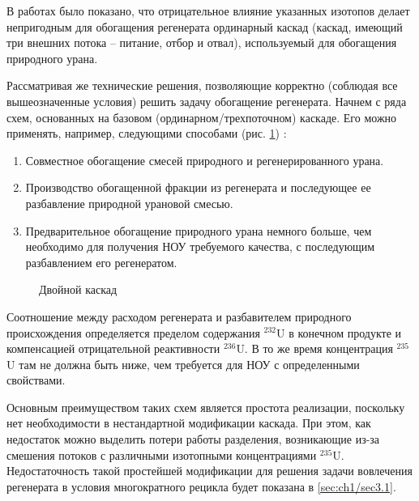 В работах \cite{sulaberidzeNekotoryhRazdelitelnyhProblemah2004,sulaberidzeProblemsRefinementRecycled4, smirnovKaskadnyeShemyZadachah2012} было показано, что отрицательное влияние указанных изотопов делает непригодным для обогащения регенерата ординарный каскад (каскад, имеющий три внешних потока – питание, отбор и отвал), используемый для обогащения природного урана.

Рассматривая же технические решения, позволяющие корректно (соблюдая все вышеозначенные условия) решить задачу обогащение регенерата. Начнем с ряда схем, основанных на базовом (ординарном/трехпоточном) каскаде.
Его можно применять, например, следующими способами (рис. \ref{fig:diagram1}) \cite{smirnovKaskadnyeShemyZadachah2012}:
\begin{enumerate}
  \item Совместное обогащение смесей природного и регенерированного урана.
  \item Производство обогащенной фракции из регенерата и последующее ее разбавление природной урановой смесью.
  \item Предварительное обогащение природного урана немного больше, чем необходимо для получения НОУ требуемого качества, с последующим разбавлением его регенератом.
\end{enumerate}

\begin{figure}[ht]
  \caption{Двойной каскад}\label{fig:diagram1}
\end{figure}

Соотношение между расходом регенерата и разбавителем природного происхождения определяется пределом содержания $^{232}$U в конечном продукте и компенсацией отрицательной реактивности $^{236}$U. В то же время концентрация $^{235}$U там не должна быть ниже, чем требуется для НОУ с определенными свойствами.

Основным преимуществом таких схем является простота реализации, поскольку нет необходимости в нестандартной модификации каскада. При этом, как недостаток можно выделить потери работы разделения, возникающие из-за смешения потоков с различными изотопными концентрациями $^{235}$U. 
Недостаточность такой простейшей модификации для решения задачи вовлечения регенерата в условия многократного рецикла будет показана в \ref{sec:ch1/sec3.1}.

